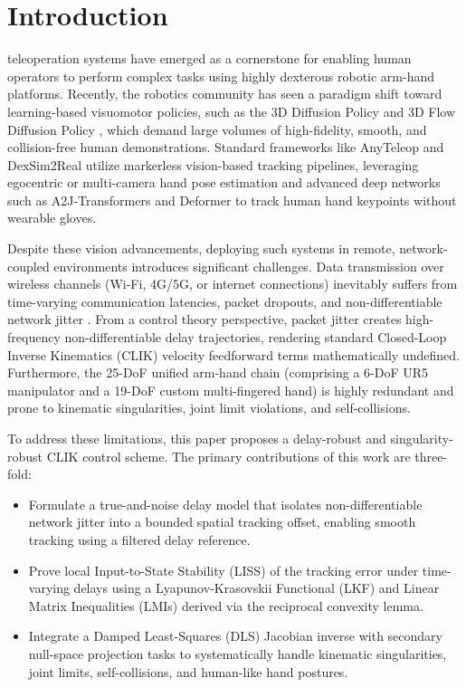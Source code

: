 \documentclass[letterpaper,journal]{IEEEtran}
\begin{document}
\section{Introduction}
 teleoperation systems have emerged as a cornerstone for enabling human operators to perform complex tasks using highly dexterous robotic arm-hand platforms. Recently, the robotics community has seen a paradigm shift toward learning-based visuomotor policies, such as the 3D Diffusion Policy \cite{ref_diffpolicy3d} and 3D Flow Diffusion Policy \cite{ref_flowdiff}, which demand large volumes of high-fidelity, smooth, and collision-free human demonstrations. Standard frameworks like AnyTeleop \cite{ref_anyteleop} and DexSim2Real \cite{ref_dexsim2real} utilize markerless vision-based tracking pipelines, leveraging egocentric or multi-camera hand pose estimation \cite{ref_egocentric3d, ref_deltadorsal, ref_egohand_bench} and advanced deep networks such as A2J-Transformers \cite{ref_a2j_trans} and Deformer \cite{ref_deformer} to track human hand keypoints without wearable gloves. 

Despite these vision advancements, deploying such systems in remote, network-coupled environments introduces significant challenges. Data transmission over wireless channels (Wi-Fi, 4G/5G, or internet connections) inevitably suffers from time-varying communication latencies, packet dropouts, and non-differentiable network jitter \cite{ref_tase_tele, ref_tcyb_nn, ref_tmech_manip, ref_tcst_delay}. From a control theory perspective, packet jitter creates high-frequency non-differentiable delay trajectories, rendering standard Closed-Loop Inverse Kinematics (CLIK) velocity feedforward terms mathematically undefined. Furthermore, the 25-DoF unified arm-hand chain (comprising a 6-DoF UR5 manipulator and a 19-DoF custom multi-fingered hand) is highly redundant and prone to kinematic singularities, joint limit violations, and self-collisions.

To address these limitations, this paper proposes a delay-robust and singularity-robust CLIK control scheme. The primary contributions of this work are three-fold:
\begin{itemize}
\item Formulate a true-and-noise delay model that isolates non-differentiable network jitter into a bounded spatial tracking offset, enabling smooth tracking using a filtered delay reference.
\item Prove local Input-to-State Stability (LISS) of the tracking error under time-varying delays using a Lyapunov-Krasovskii Functional (LKF) and Linear Matrix Inequalities (LMIs) derived via the reciprocal convexity lemma.
\item Integrate a Damped Least-Squares (DLS) Jacobian inverse with secondary null-space projection tasks to systematically handle kinematic singularities, joint limits, self-collisions, and human-like hand postures.
\end{itemize}
\end{document}
